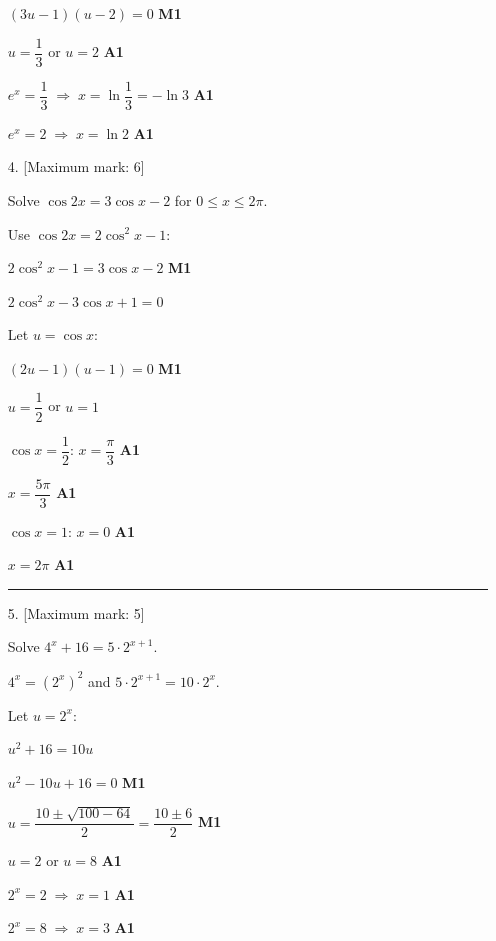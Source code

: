 \documentclass[12pt, twoside]{article}
\begin{document}
\begin{enumerate}[itemsep=0.3cm]
$(3u - 1)(u - 2) = 0$ \hfill \textbf{M1}

$u = \dfrac{1}{3}$ or $u = 2$ \hfill \textbf{A1}

$e^x = \dfrac{1}{3} \;\Rightarrow\; x = \ln \dfrac{1}{3} = -\ln 3$ \hfill \textbf{A1}

$e^x = 2 \;\Rightarrow\; x = \ln 2$ \hfill \textbf{A1}

\newpage

\item[4.] [Maximum mark: 6]

Solve $\cos 2x = 3\cos x - 2$ for $0 \le x \le 2\pi$.

\medskip

Use $\cos 2x = 2\cos^2 x - 1$:

$2\cos^2 x - 1 = 3\cos x - 2$ \hfill \textbf{M1}

$2\cos^2 x - 3\cos x + 1 = 0$

Let $u = \cos x$:

$(2u - 1)(u - 1) = 0$ \hfill \textbf{M1}

$u = \dfrac{1}{2}$ or $u = 1$

$\cos x = \dfrac{1}{2}$: \quad $x = \dfrac{\pi}{3}$ \hfill \textbf{A1}

 $x = \dfrac{5\pi}{3}$ \hfill \textbf{A1}

$\cos x = 1$: \quad $x = 0$ \hfill \textbf{A1}

\hphantom{$\cos x = 1$:\quad} $x = 2\pi$ \hfill \textbf{A1}

\bigskip
\hrule
\bigskip

\item[5.] [Maximum mark: 5]

Solve $4^x + 16 = 5 \cdot 2^{x+1}$.

\medskip

$4^x = (2^x)^2$ and $5 \cdot 2^{x+1} = 10 \cdot 2^x$.

Let $u = 2^x$:

$u^2 + 16 = 10u$

$u^2 - 10u + 16 = 0$ \hfill \textbf{M1}

$u = \dfrac{10 \pm \sqrt{100 - 64}}{2} = \dfrac{10 \pm 6}{2}$ \hfill \textbf{M1}

$u = 2$ or $u = 8$ \hfill \textbf{A1}

$2^x = 2 \;\Rightarrow\; x = 1$ \hfill \textbf{A1}

$2^x = 8 \;\Rightarrow\; x = 3$ \hfill \textbf{A1}


\end{enumerate}
\end{document}
